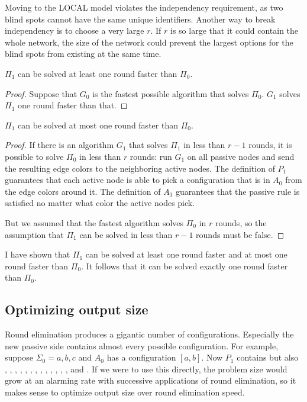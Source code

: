 \documentclass[english, 12pt, a4paper, sci, a-1b, online]{aaltothesis}
\begin{document}
Moving to the LOCAL model violates the independency requirement, as two blind spots cannot have the same unique identifiers. Another way to break independency is to choose a very large $r$. If $r$ is so large that it could contain the whole network, the size of the network could prevent the largest options for the blind spots from existing at the same time.

\begin{lemma}
  $\Pi_1$ can be solved at least one round faster than $\Pi_0$.
\end{lemma}
\begin{proof}
  Suppose that $G_0$ is the fastest possible algorithm that solves $\Pi_0$. $G_1$ solves $\Pi_1$ one round faster than that.
\end{proof}

\begin{lemma}
  $\Pi_1$ can be solved at most one round faster than $\Pi_0$.
\end{lemma}
\begin{proof}
  If there is an algorithm $G_1$ that solves $\Pi_1$ in less than $r-1$ rounds, it is possible to solve $\Pi_0$ in less than $r$ rounds: run $G_1$ on all passive nodes and send the resulting edge colors to the neighboring active nodes. The definition of $P_1$ guarantees that each active node is able to pick a configuration that is in $A_0$ from the edge colors around it. The definition of $A_1$ guarantees that the passive rule is satisfied no matter what color the active nodes pick.

  But we assumed that the fastest algorithm solves $\Pi_0$ in $r$ rounds, so the assumption that $\Pi_1$ can be solved in less than $r-1$ rounds must be false.
\end{proof}

I have shown that $\Pi_1$ can be solved at least one round faster and at most one round faster than $\Pi_0$. It follows that it can be solved exactly one round faster than $\Pi_0$.

\subsection{Optimizing output size}

Round elimination produces a gigantic number of configurations. Especially the new passive side contains almost every possible configuration. For example, suppose $\Sigma_{0} = {a, b, c}$ and $A_0$ has a configuration $[a, b]$. Now $P_{1}$ contains  but also , , , , , , , , , , , , ,  and . If we were to use this directly, the problem size would grow at an alarming rate with successive applications of round elimination, so it makes sense to optimize output size over round elimination speed.
\end{document}
